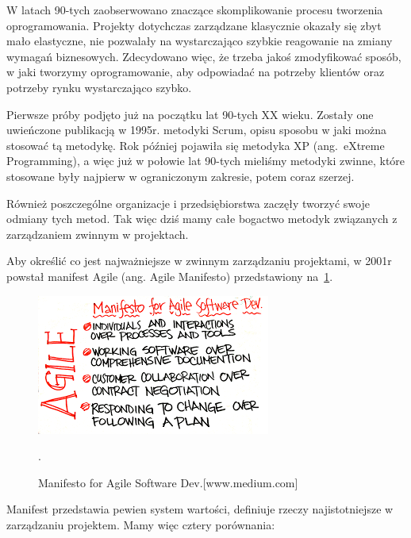 W latach 90-tych zaobserwowano znaczące skomplikowanie procesu tworzenia oprogramowania.
Projekty dotychczas zarządzane klasycznie okazały się zbyt mało elastyczne,
nie pozwalały na wystarczająco szybkie reagowanie na zmiany wymagań biznesowych.
Zdecydowano więc, że trzeba jakoś zmodyfikować sposób, w jaki tworzymy oprogramowanie,
aby odpowiadać na potrzeby klientów oraz potrzeby rynku wystarczająco szybko.

Pierwsze próby podjęto już na początku lat 90-tych XX wieku. Zostały one uwieńczone publikacją w 1995r.
metodyki Scrum, opisu sposobu w jaki można stosować tą metodykę.
Rok później pojawiła się metodyka XP (ang.\ eXtreme Programming),
a więc już w połowie lat 90-tych mieliśmy metodyki zwinne, które stosowane były
najpierw w ograniczonym zakresie, potem coraz szerzej.

Również poszczególne organizacje i przedsiębiorstwa zaczęły tworzyć swoje odmiany tych metod.
Tak więc dziś mamy całe bogactwo metodyk związanych z zarządzaniem zwinnym w projektach.

Aby określić co jest najważniejsze w zwinnym zarządzaniu projektami, w 2001r powstał manifest Agile
(ang. Agile Manifesto) przedstawiony na~\ref{rys:agile}.

\begin{figure}
	\centering\includegraphics[width=.6\textwidth]{img/agile}
	\caption{Manifesto for Agile Software Dev.[www.medium.com]}.\label{rys:agile}
\end{figure}

Manifest przedstawia pewien system wartości, definiuje rzeczy najistotniejsze w zarządzaniu projektem.
Mamy więc cztery porównania:

